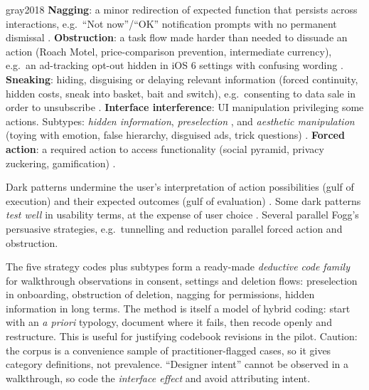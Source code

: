 \begin{papercard}{gray2018}
 \textbf{Nagging}: a minor redirection of expected function that persists across interactions, e.g.\ ``Not now''/``OK'' notification prompts with no permanent dismissal . \textbf{Obstruction}: a task flow made harder than needed to dissuade an action (Roach Motel, price-comparison prevention, intermediate currency), e.g.\ an ad-tracking opt-out hidden in iOS 6 settings with confusing wording . \textbf{Sneaking}: hiding, disguising or delaying relevant information (forced continuity, hidden costs, sneak into basket, bait and switch), e.g.\ consenting to data sale in order to unsubscribe . \textbf{Interface interference}: UI manipulation privileging some actions. Subtypes: \emph{hidden information}, \emph{preselection} , and \emph{aesthetic manipulation} (toying with emotion, false hierarchy, disguised ads, trick questions) . \textbf{Forced action}: a required action to access functionality (social pyramid, privacy zuckering, gamification) .

 Dark patterns undermine the user's interpretation of action possibilities (gulf of execution) and their expected outcomes (gulf of evaluation) . Some dark patterns \emph{test well} in usability terms, at the expense of user choice . Several parallel Fogg's persuasive strategies, e.g.\ tunnelling and reduction parallel forced action and obstruction.

 The five strategy codes plus subtypes form a ready-made \emph{deductive code family} for walkthrough observations in consent, settings and deletion flows: preselection in onboarding, obstruction of deletion, nagging for permissions, hidden information in long terms. The method is itself a model of hybrid coding: start with an \emph{a priori} typology, document where it fails, then recode openly and restructure. This is useful for justifying codebook revisions in the pilot. Caution: the corpus is a convenience sample of practitioner-flagged cases, so it gives category definitions, not prevalence. ``Designer intent'' cannot be observed in a walkthrough, so code the \emph{interface effect} and avoid attributing intent.
\end{papercard}

